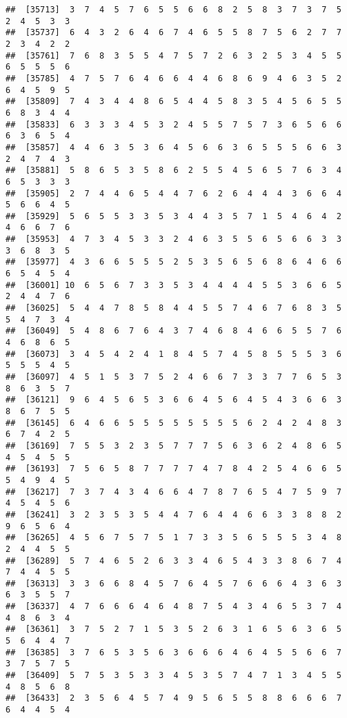 \documentclass[
]{book}
\begin{document}
\begin{verbatim}
##  [35713]  3  7  4  5  7  6  5  5  6  6  8  2  5  8  3  7  3  7  5  2  4  5  3  3
##  [35737]  6  4  3  2  6  4  6  7  4  6  5  5  8  7  5  6  2  7  7  2  3  4  2  2
##  [35761]  7  6  8  3  5  5  4  7  5  7  2  6  3  2  5  3  4  5  5  6  5  5  5  6
##  [35785]  4  7  5  7  6  4  6  6  4  4  6  8  6  9  4  6  3  5  2  6  4  5  9  5
##  [35809]  7  4  3  4  4  8  6  5  4  4  5  8  3  5  4  5  6  5  5  6  8  3  4  4
##  [35833]  6  3  3  3  4  5  3  2  4  5  5  7  5  7  3  6  5  6  6  6  3  6  5  4
##  [35857]  4  4  6  3  5  3  6  4  5  6  6  3  6  5  5  5  6  6  3  2  4  7  4  3
##  [35881]  5  8  6  5  3  5  8  6  2  5  5  4  5  6  5  7  6  3  4  6  5  3  3  3
##  [35905]  2  7  4  4  6  5  4  4  7  6  2  6  4  4  4  3  6  6  4  5  6  6  4  5
##  [35929]  5  6  5  5  3  3  5  3  4  4  3  5  7  1  5  4  6  4  2  4  6  6  7  6
##  [35953]  4  7  3  4  5  3  3  2  4  6  3  5  5  6  5  6  6  3  3  3  6  8  3  5
##  [35977]  4  3  6  6  5  5  5  2  5  3  5  6  5  6  8  6  4  6  6  6  5  4  5  4
##  [36001] 10  6  5  6  7  3  3  5  3  4  4  4  4  5  5  3  6  6  5  2  4  4  7  6
##  [36025]  5  4  4  7  8  5  8  4  4  5  5  7  4  6  7  6  8  3  5  5  4  7  3  4
##  [36049]  5  4  8  6  7  6  4  3  7  4  6  8  4  6  6  5  5  7  6  4  6  8  6  5
##  [36073]  3  4  5  4  2  4  1  8  4  5  7  4  5  8  5  5  5  3  6  5  5  5  4  5
##  [36097]  4  5  1  5  3  7  5  2  4  6  6  7  3  3  7  7  6  5  3  8  6  3  5  7
##  [36121]  9  6  4  5  6  5  3  6  6  4  5  6  4  5  4  3  6  6  3  8  6  7  5  5
##  [36145]  6  4  6  6  5  5  5  5  5  5  5  5  6  2  4  2  4  8  3  6  7  4  2  5
##  [36169]  7  5  5  3  2  3  5  7  7  7  5  6  3  6  2  4  8  6  5  4  5  4  5  5
##  [36193]  7  5  6  5  8  7  7  7  7  4  7  8  4  2  5  4  6  6  5  5  4  9  4  5
##  [36217]  7  3  7  4  3  4  6  6  4  7  8  7  6  5  4  7  5  9  7  4  5  4  5  6
##  [36241]  3  2  3  5  3  5  4  4  7  6  4  4  6  6  3  3  8  8  2  9  6  5  6  4
##  [36265]  4  5  6  7  5  7  5  1  7  3  3  5  6  5  5  5  3  4  8  2  4  4  5  5
##  [36289]  5  7  4  6  5  2  6  3  3  4  6  5  4  3  3  8  6  7  4  7  4  4  5  5
##  [36313]  3  3  6  6  8  4  5  7  6  4  5  7  6  6  6  4  3  6  3  6  3  5  5  7
##  [36337]  4  7  6  6  6  4  6  4  8  7  5  4  3  4  6  5  3  7  4  4  8  6  3  4
##  [36361]  3  7  5  2  7  1  5  3  5  2  6  3  1  6  5  6  3  6  5  5  6  4  4  7
##  [36385]  3  7  6  5  3  5  6  3  6  6  6  4  6  4  5  5  6  6  7  3  7  5  7  5
##  [36409]  5  7  5  3  5  3  3  4  5  3  5  7  4  7  1  3  4  5  5  4  8  5  6  8
##  [36433]  2  3  5  6  4  5  7  4  9  5  6  5  5  8  8  6  6  6  7  6  4  4  5  4

\end{verbatim}
\end{document}
